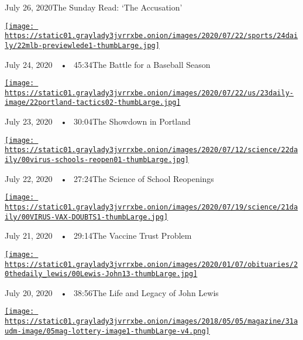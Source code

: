 July 26, 2020The Sunday Read: `The Accusation'

\href{https://www.nytimes3xbfgragh.onion/2020/07/24/podcasts/the-daily/mlb-baseball-season-coronavirus.html?action=click\&module=audio-series-bar\&region=header\&pgtype=Article}{\texttt{[image: https://static01.graylady3jvrrxbe.onion/images/2020/07/22/sports/24daily/22mlb-previewlede1-thumbLarge.jpg]}}

July 24, 2020~~•~ 45:34The Battle for a Baseball Season

\href{https://www.nytimes3xbfgragh.onion/2020/07/23/podcasts/the-daily/portland-protests.html?action=click\&module=audio-series-bar\&region=header\&pgtype=Article}{\texttt{[image: https://static01.graylady3jvrrxbe.onion/images/2020/07/22/us/23daily-image/22portland-tactics02-thumbLarge.jpg]}}

July 23, 2020~~•~ 30:04The Showdown in Portland

\href{https://www.nytimes3xbfgragh.onion/2020/07/22/podcasts/the-daily/school-reopenings-coronavirus.html?action=click\&module=audio-series-bar\&region=header\&pgtype=Article}{\texttt{[image: https://static01.graylady3jvrrxbe.onion/images/2020/07/12/science/22daily/00virus-schools-reopen01-thumbLarge.jpg]}}

July 22, 2020~~•~ 27:24The Science of School Reopenings

\href{https://www.nytimes3xbfgragh.onion/2020/07/21/podcasts/the-daily/coronavirus-vaccine.html?action=click\&module=audio-series-bar\&region=header\&pgtype=Article}{\texttt{[image: https://static01.graylady3jvrrxbe.onion/images/2020/07/19/science/21daily/00VIRUS-VAX-DOUBTS1-thumbLarge.jpg]}}

July 21, 2020~~•~ 29:14The Vaccine Trust Problem

\href{https://www.nytimes3xbfgragh.onion/2020/07/20/podcasts/the-daily/john-lewis.html?action=click\&module=audio-series-bar\&region=header\&pgtype=Article}{\texttt{[image: https://static01.graylady3jvrrxbe.onion/images/2020/01/07/obituaries/20thedaily\_lewis/00Lewis-John13-thumbLarge.jpg]}}

July 20, 2020~~•~ 38:56The Life and Legacy of John Lewis

\href{https://www.nytimes3xbfgragh.onion/2020/07/19/podcasts/the-daily/lottery-winner-scam.html?action=click\&module=audio-series-bar\&region=header\&pgtype=Article}{\texttt{[image: https://static01.graylady3jvrrxbe.onion/images/2018/05/05/magazine/31audm-image/05mag-lottery-image1-thumbLarge-v4.png]}}

